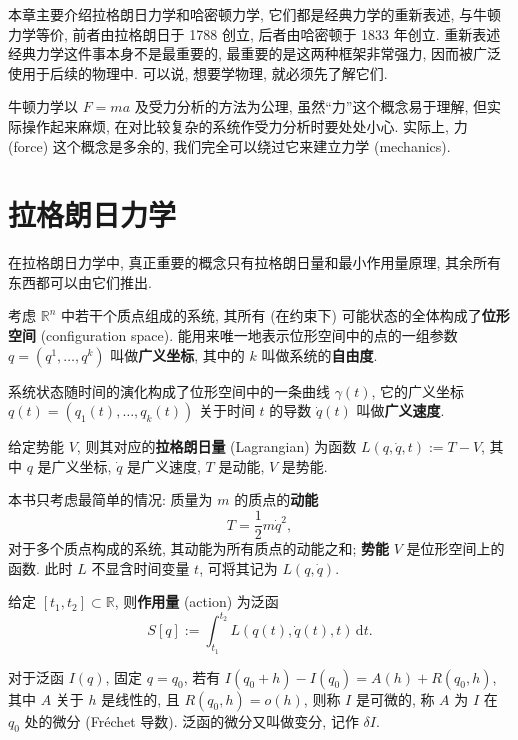 本章主要介绍拉格朗日力学和哈密顿力学, 它们都是经典力学的重新表述, 与牛顿力学等价, 前者由拉格朗日于 1788 创立, 后者由哈密顿于 1833 年创立. 重新表述经典力学这件事本身不是最重要的, 最重要的是这两种框架非常强力, 因而被广泛使用于后续的物理中. 可以说, 想要学物理, 就必须先了解它们.

牛顿力学以 $ F=ma $ 及受力分析的方法为公理, 虽然``力''这个概念易于理解, 但实际操作起来麻烦, 在对比较复杂的系统作受力分析时要处处小心. 实际上, 力 (force) 这个概念是多余的, 我们完全可以绕过它来建立力学 (mechanics).

\section{拉格朗日力学}
在拉格朗日力学中, 真正重要的概念只有拉格朗日量和最小作用量原理, 其余所有东西都可以由它们推出.

考虑 $ \mathbb{R}^n $ 中若干个质点组成的系统, 其所有 (在约束下) 可能状态的全体构成了\textbf{位形空间} (configuration space). 能用来唯一地表示位形空间中的点的一组参数 $ q=(q^1,\dots,q^k) $ 叫做\textbf{广义坐标}, 其中的 $ k $ 叫做系统的\textbf{自由度}. 

系统状态随时间的演化构成了位形空间中的一条曲线 $ \gamma(t) $, 它的广义坐标 $ q(t)=(q_1(t),\dots,q_k(t)) $ 关于时间 $ t $ 的导数 $ \dot{q}(t) $ 叫做\textbf{广义速度}.
\begin{definition}[拉格朗日量]
    给定势能 $ V $, 则其对应的{\bf 拉格朗日量} (Lagrangian) 为函数 $ L(q,\dot{q},t):=T-V $, 其中 $ q $ 是广义坐标, $ \dot{q} $ 是广义速度, $ T $ 是动能, $ V $ 是势能.
\end{definition}
本书只考虑最简单的情况: 质量为 $ m $ 的质点的{\bf 动能}
\[ T=\frac{1}{2}m\dot{q}^2, \] 
对于多个质点构成的系统, 其动能为所有质点的动能之和; {\bf 势能} $ V $ 是位形空间上的函数. 此时 $ L $ 不显含时间变量 $ t $, 可将其记为 $ L(q,\dot{q}) $.

\begin{definition}[作用量]
    给定 $ [t_1,t_2]\subset\mathbb{R} $, 则{\bf 作用量} (action) 为泛函
    \[ S[q] :=\int_{t_1}^{t_2}L(q(t),\dot{q}(t),t)\,\mathrm{d}t.\]
\end{definition}

对于泛函 $ I(q) $, 固定 $ q=q_0 $, 若有 $ I(q_0+h)-I(q_0)=A(h)+R(q_0,h) $, 其中 $ A $ 关于 $ h $ 是线性的, 且 $ R(q_0,h)=o(h) $, 则称 $ I $ 是可微的, 称 $ A $ 为 $ I $ 在 $ q_0 $ 处的微分 (Fr\'{e}chet 导数). 泛函的微分又叫做变分, 记作 $ \delta I $.

